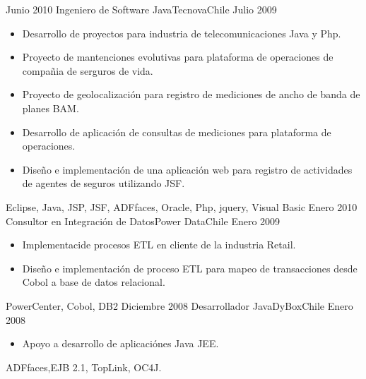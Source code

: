 \begin{experiences}
  \emptySeparator
  \experience
  {Junio 2010}      {Ingeniero de Software Java}{Tecnova}{Chile}
  {Julio 2009}      {
                    \begin{itemize}
                      \item Desarrollo de proyectos para industria de telecomunicaciones Java y Php.
                      \item Proyecto de mantenciones evolutivas para plataforma de operaciones de compañia de serguros de vida.
                      \item Proyecto de geolocalizaci\'on para registro de mediciones de ancho de banda de planes BAM.
                      \item Desarrollo de aplicaci\'on de consultas de mediciones para plataforma de operaciones.
                      \item Diseño e implementaci\'on de una aplicaci\'on web para registro de actividades de agentes de seguros utilizando JSF.
                    \end{itemize}
                    }
                    {Eclipse, Java, JSP, JSF, ADFfaces, Oracle, Php, jquery, Visual Basic}
  \emptySeparator
  \experience
  {Enero 2010}    {Consultor en Integraci\'on de Datos}{Power Data}{Chile}
  {Enero 2009}     {
                      \begin{itemize}
                        \item Implementaci\on de procesos ETL en cliente de la industria Retail.
                        \item Diseño e implementaci\'on de proceso ETL para mapeo de transacciones desde Cobol a base de datos relacional.
                      \end{itemize}
                    }
                    {
                      PowerCenter, Cobol, DB2
                    }
  \emptySeparator
  \experience
  {Diciembre 2008}    {Desarrollador Java}{DyBox}{Chile}
  {Enero 2008}   {
                      \begin{itemize}
                        \item Apoyo a desarrollo de aplicaci\'ones Java JEE.
                      \end{itemize}
                    }
                    {
                      ADFfaces,EJB 2.1, TopLink, OC4J.
                    }

\end{experiences}
